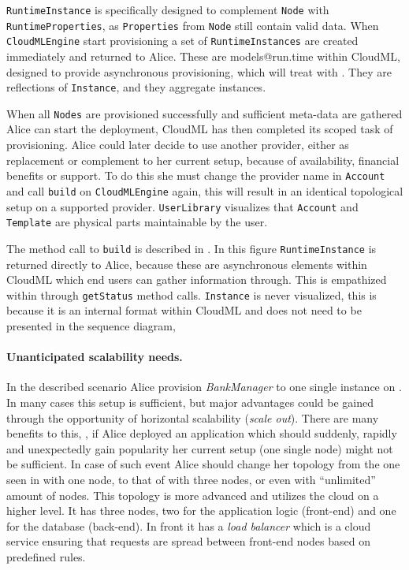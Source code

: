 \texttt{RuntimeInstance} is specifically designed to complement \texttt{Node} with \texttt{RuntimeProperties},
as \texttt{Properties} from \texttt{Node} still contain valid data.
When \texttt{CloudMLEngine} start provisioning a set of \texttt{RuntimeInstances} are created immediately 
and returned to Alice.
These are models@run.time within CloudML, designed to provide asynchronous provisioning,
which will treat with .
They are reflections of \texttt{Instance}, and they aggregate instances.

When all \texttt{Nodes} are provisioned successfully and sufficient meta-data are gathered
Alice can start the deployment, CloudML has then completed its scoped task of provisioning.
Alice could later decide to use another provider, either as replacement or complement to her current setup,
because of availability, financial benefits or support.
To do this she must change the provider name in \texttt{Account} and call \texttt{build} on \texttt{CloudMLEngine} again,
this will result in an identical topological setup on a supported provider.
\texttt{UserLibrary} visualizes that \texttt{Account} and \texttt{Template} are 
physical parts maintainable by the user.

The method call to \texttt{build} is described in .
In this figure \texttt{RuntimeInstance} is returned directly to Alice,
because these are asynchronous elements within CloudML which end users can gather 
information through.
This is empathized within  through \texttt{getStatus} method calls.
\texttt{Instance} is never visualized, this is because it is an internal format
within CloudML and does not need to be presented in the sequence diagram,

\paragraph{Unanticipated scalability needs.}

In the described scenario Alice provision \emph{BankManager} to one single instance on .
In many cases this setup is sufficient, but major advantages
could be gained through the opportunity of horizontal scalability (\emph{scale out}).
There are many benefits to this, 
\eg, if Alice deployed an application which should suddenly, 
rapidly and unexpectedly gain popularity her current setup (one single node) might not be sufficient.
In case of such event Alice should change her topology from the one seen in 
 with one node, to that of  with three nodes,
or even  with ``unlimited'' amount of nodes.
This topology is more advanced and utilizes the cloud on a higher level.
It has three nodes, two for the application logic (front-end) and one for the database (back-end).
In front it has a \emph{load balancer} which is a cloud service ensuring that requests
are spread between front-end nodes based on predefined rules.

